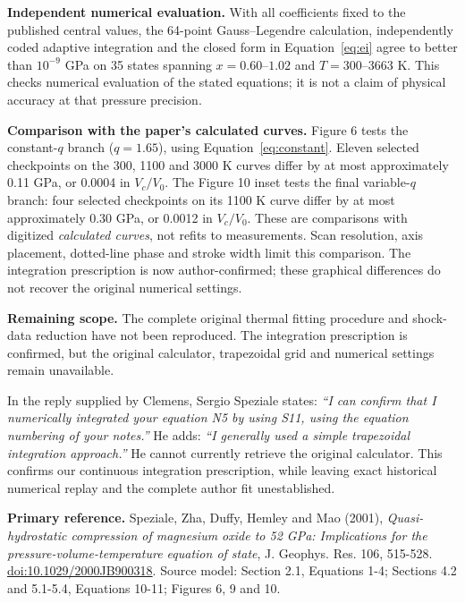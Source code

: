 \documentclass[a4paper,10pt]{article}
\newcommand{\sectiontitle}[1]{\vspace{5pt}{\large\bfseries\color{ink}#1}\par}
\begin{document}
\textbf{Independent numerical evaluation.} With all coefficients fixed to the
published central values, the 64-point Gauss--Legendre calculation, independently
coded adaptive integration and the closed form in Equation~\eqref{eq:ei} agree
to better than $10^{-9}$ GPa on 35 states spanning $x=0.60$--$1.02$ and
$T=300$--$3663$ K. This checks numerical evaluation of the stated equations;
it is not a claim of physical accuracy at that pressure precision.

\textbf{Comparison with the paper's calculated curves.} Figure 6 tests the
constant-$q$ branch ($q=1.65$), using Equation~\eqref{eq:constant}. Eleven
selected checkpoints on the 300, 1100 and 3000 K curves differ by at most
approximately 0.11 GPa, or 0.0004 in $V_c/V_0$. The Figure 10 inset tests the
final variable-$q$ branch: four selected checkpoints on its 1100 K curve differ
by at most approximately 0.30 GPa, or 0.0012 in $V_c/V_0$. These are comparisons
with digitized \emph{calculated curves}, not refits to measurements. Scan
resolution, axis placement, dotted-line phase and stroke width limit this
comparison. The integration prescription is now author-confirmed; these
graphical differences do not recover the original numerical settings.

\textbf{Remaining scope.} The complete original thermal fitting procedure and
shock-data reduction have not been reproduced. The integration prescription
is confirmed, but the original calculator, trapezoidal grid and numerical
settings remain unavailable.

\sectiontitle{7. Author confirmation recorded on 9 October 2026}
In the reply supplied by Clemens, Sergio Speziale states:
\emph{``I can confirm that I numerically integrated your equation N5 by using
S11, using the equation numbering of your notes.''} He adds:
\emph{``I generally used a simple trapezoidal integration approach.''}
He cannot currently retrieve the original calculator. This confirms our
continuous integration prescription, while leaving exact historical numerical
replay and the complete author fit unestablished.

\vspace{4pt}
{\small\textbf{Primary reference.} Speziale, Zha, Duffy, Hemley and Mao (2001),
\emph{Quasi-hydrostatic compression of magnesium oxide to 52 GPa:
Implications for the pressure-volume-temperature equation of state},
J. Geophys. Res. 106, 515-528.
\href{https://doi.org/10.1029/2000JB900318}{doi:10.1029/2000JB900318}.
Source model: Section 2.1, Equations 1-4; Sections 4.2 and 5.1-5.4,
Equations 10-11; Figures 6, 9 and 10.}
\end{document}
